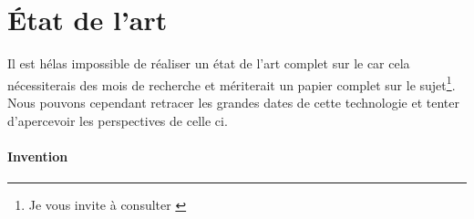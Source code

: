 \section{État de l'art}
Il est hélas impossible de réaliser un état de l'art complet sur le
\raytracing car cela nécessiterais des mois de recherche et mériterait un
papier complet sur le sujet\footnote{Je vous invite à consulter
\cite{Wald01stateof}}. Nous pouvons cependant retracer les grandes dates
de cette technologie et tenter d'apercevoir les perspectives de celle ci.

\paragraph{Invention}

